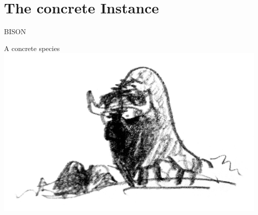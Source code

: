 \section{The concrete Instance}
\begin{frame}{BISON}
    \centering
    \begin{minipage}{0.63\textwidth}
    \centering
    \begin{block}{A concrete species}
        \centering
        \vspace{2pt}
        \includegraphics[height=0.7\textheight]{data/bison-logo}
    \end{block}
    \end{minipage}
\end{frame}

